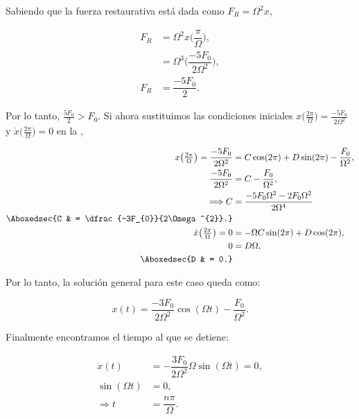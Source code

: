 \documentclass[../main.tex]{subfiles}
\begin{document}
Sabiendo que la fuerza restaurativa está dada como
\(F_{R} = \Omega^{2}x\),

\begin{align*}
	F_{R} & = \Omega^{2}x \biggl(\dfrac{\pi}{\Omega}\biggr),        \\
	      & = \Omega^{3}\biggl(\dfrac{-5F_{0}}{2\Omega^{2}}\biggr), \\
	F_{R} & = \dfrac{-5F_{0}}{2}.
\end{align*}

Por lo tanto, \( \tfrac{5F_{0}}{2} > F_{0}\). Si ahora sustituimos
las condiciones iniciales \( x \bigl(\tfrac{2\pi}{\Omega}\bigr) = \tfrac{-5F_{0}}{2\Omega^{2}}\) y \(\dot{x}\bigl(\tfrac{2\pi}{\Omega}\bigr) = 0\) en
la ,

\begin{align*}
	x\bigl(\tfrac{2\pi}{\Omega}\bigr) = \dfrac{-5F_{0}}{2\Omega^{2}} & = C\cos(2\pi) + D\sin(2\pi) - \dfrac{F_{0}}{\Omega^{2}},    \\
	\dfrac{-5F_{0}}{2\Omega^{2}}                                     & = C - \dfrac{F_{0}}{\Omega^{2}},                            \\
	\Longrightarrow C                                                & = \dfrac{-5F_{0}\Omega^{2} - 2F_{0}\Omega^{2}}{2\Omega^{4}} \\
	\Aboxedsec{C                                                     & = \dfrac{-3F_{0}}{2\Omega^{2}}.}                            \\
	\dot{x}\bigl(\tfrac{2\pi}{\Omega}\bigr) = 0                      & = -\Omega C\sin(2\pi) + D\cos(2\pi),                        \\
	0                                                                & = D\Omega,                                                  \\
	\Aboxedsec{D                                                     & = 0.}
\end{align*}

Por lo tanto, la solución general para este caso queda como:

\begin{equation*}
	x(t) = \dfrac{-3F_{0}}{2\Omega^{2}}\cos(\Omega t) - \dfrac{F_{0}}{\Omega^{2}}.
\end{equation*}

Finalmente encontramos el tiempo al que se detiene:

\begin{align*}
	\dot{x}(t)        & = -\dfrac{3F_{0}}{2\Omega^{2}}\Omega\sin(\Omega t) = 0, \\
	\sin(\Omega t)    & = 0,                                                    \\
	\Longrightarrow t & = \dfrac{n\pi}{\Omega}.
\end{align*}
\end{document}
